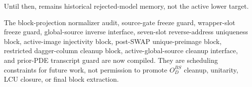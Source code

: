 Until then,  remains historical
rejected-model memory, not the active lower target.

The block-projection normalizer audit, source-gate freeze guard,
wrapper-slot freeze guard, global-source inverse interface, seven-slot
reverse-address uniqueness block, active-image injectivity block,
post-SWAP unique-preimage block, restricted dagger-column cleanup block,
active-global-source cleanup interface, and prior-PDE transcript guard are now
compiled.  They are scheduling constraints for future work, not permission to
promote \(O_D^{BS}\) cleanup, unitarity, LCU closure, or final block
extraction.
